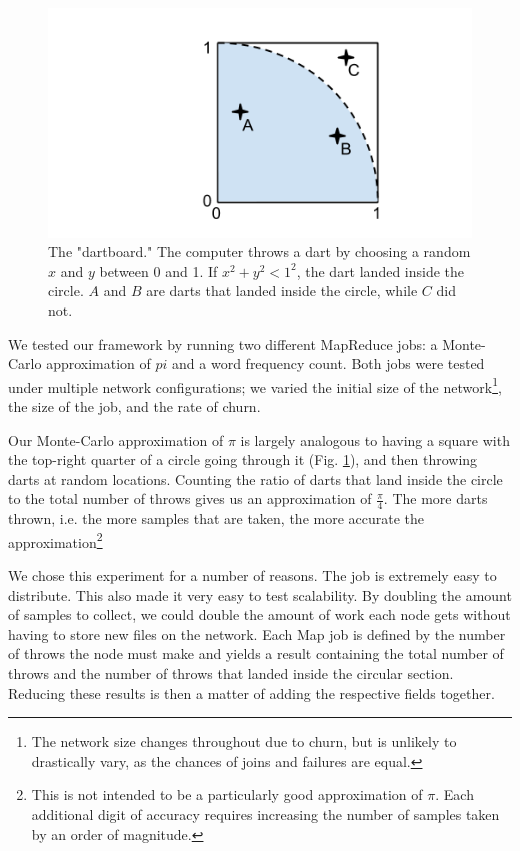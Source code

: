 \begin{figure}
    \includegraphics[width=\linewidth]{dartboard}
    \caption{The "dartboard." The computer throws a dart by choosing a random $x$ and $y$ between 0 and 1.  If $x^{2} + y^{2} < 1^{2} $, the dart landed inside the circle.  $A$ and $B$ are darts that landed inside the circle, while $C$ did not.}
    \label{dartboard}
\end{figure}



We tested our framework by running two different MapReduce jobs: a Monte-Carlo approximation of $pi$ and a word frequency count.  
Both jobs were tested under multiple network configurations; we varied the initial size of the network\footnote{The network size changes throughout due to churn, but is unlikely to drastically vary, as the chances of joins and failures are equal.}, the size of the job, and the rate of churn.

Our Monte-Carlo approximation of $\pi$ is largely analogous to having a square with the top-right quarter of a circle going through it (Fig. \ref{dartboard}), and then throwing darts at random locations.  Counting the ratio of darts that land inside the circle to the total number of throws gives us an approximation of $\frac{\pi}{4}$.  The more darts thrown, i.e. the more samples that are taken, the more accurate the approximation\footnote{This is not intended to be a particularly good approximation of $\pi$. Each additional digit of accuracy requires increasing the number of samples taken by an order of magnitude.}

We chose this experiment for a number of reasons. The job is extremely easy to distribute.  This also made it very easy to test scalability. By doubling the amount of samples to collect, we could double the amount of work each node gets without having to store new files on the network.  
Each Map job is defined by the number of throws the node must make and yields a result containing the total number of throws and the number of throws that landed inside the circular section.  Reducing these results is then a matter of adding the respective fields together. 


